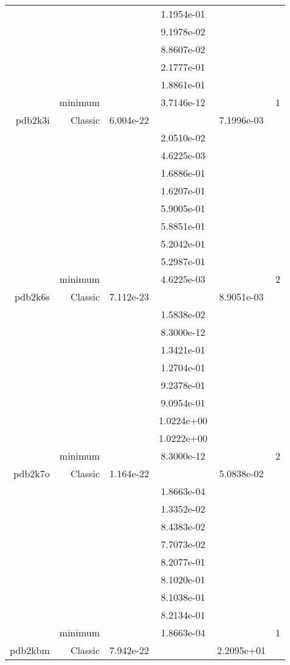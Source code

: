 \begin{xltabular}{\textwidth}{r|rS[table-format=1.3e+2]S[table-format=1.4e+2]S[table-format=1.4e+2]S[table-format=-1.5]}
&  &  & 1.1954e-01 & & \\
&  &  & 9.1978e-02 & & \\
&  &  & 8.8607e-02 & & \\
&  &  & 2.1777e-01 & & \\
&  &  & 1.8861e-01 & & \\
& minimum &  & 3.7146e-12 & & 1 \\  \addlinespace
pdb2k3i & Classic & 6.004e-22 &  & 7.1996e-03 & \\
&  &  & 2.0510e-02 & & \\
&  &  & 4.6225e-03 & & \\
&  &  & 1.6886e-01 & & \\
&  &  & 1.6207e-01 & & \\
&  &  & 5.9005e-01 & & \\
&  &  & 5.8851e-01 & & \\
&  &  & 5.2042e-01 & & \\
&  &  & 5.2987e-01 & & \\
& minimum &  & 4.6225e-03 & & 2 \\  \addlinespace
pdb2k6s & Classic & 7.112e-23 &  & 8.9051e-03 & \\
&  &  & 1.5838e-02 & & \\
&  &  & 8.3000e-12 & & \\
&  &  & 1.3421e-01 & & \\
&  &  & 1.2704e-01 & & \\
&  &  & 9.2378e-01 & & \\
&  &  & 9.0954e-01 & & \\
&  &  & 1.0224e+00 & & \\
&  &  & 1.0222e+00 & & \\
& minimum &  & 8.3000e-12 & & 2 \\  \addlinespace
pdb2k7o & Classic & 1.164e-22 &  & 5.0838e-02 & \\
&  &  & 1.8663e-04 & & \\
&  &  & 1.3352e-02 & & \\
&  &  & 8.4383e-02 & & \\
&  &  & 7.7073e-02 & & \\
&  &  & 8.2077e-01 & & \\
&  &  & 8.1020e-01 & & \\
&  &  & 8.1038e-01 & & \\
&  &  & 8.2134e-01 & & \\
& minimum &  & 1.8663e-04 & & 1 \\  \addlinespace
pdb2kbm & Classic & 7.942e-22 &  & 2.2095e+01 & \\

\end{xltabular}
